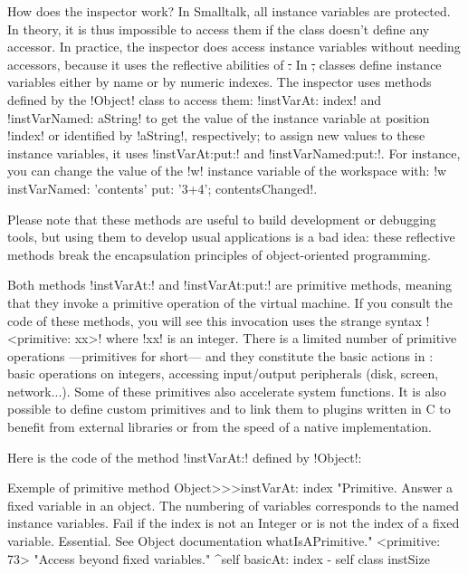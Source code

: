 \documentclass[a4paper,10pt,twoside]{book}
\begin{document}
How does the inspector work?
In Smalltalk, all instance variables are protected.
In theory, it is thus impossible to access them if the class doesn't define any accessor.
In practice, the inspector does access instance variables without needing accessors, because it uses the reflective abilities of \st.
In \st, classes define instance variables either by name or by numeric indexes.
The inspector uses methods defined by the \ct!Object! class to access them: \ct!instVarAt: index! and \ct!instVarNamed: aString! to get the value of the instance variable at position \ct!index! or identified by \ct!aString!, respectively; to assign new values to these instance variables, it uses \ct!instVarAt:put:! and \ct!instVarNamed:put:!.
For instance, you can change the value of the \ct!w! instance variable of the workspace with: \ct!w instVarNamed: 'contents' put: '3+4'; contentsChanged!.

Please note that these methods are useful to build development or debugging tools, but using them to develop usual applications is a bad idea: these reflective methods break the encapsulation principles of object-oriented programming.

Both methods \ct!instVarAt:! and \ct!instVarAt:put:! are primitive methods, meaning that they invoke a primitive operation of the \sq virtual machine.
If you consult the code of these methods, you will see this invocation uses the strange syntax \ct!<primitive: xx>! where \ct!xx! is an integer.
There is a limited number of primitive operations ---primitives for short--- and they constitute the basic actions in \sq: basic operations on integers, accessing input/output peripherals (disk, screen, network...).
Some of these primitives also accelerate system functions.
It is also possible to define custom primitives and to link them to plugins written in C to benefit from external libraries or from the speed of a native implementation.

Here is the code of the method \ct!instVarAt:! defined by \ct!Object!:
\begin{method}[instVarAt]{Exemple of primitive method}
Object>>>instVarAt: index
  "Primitive. Answer a fixed variable in an object. The numbering of variables corresponds to the named instance variables. Fail if the index is not an Integer or is not the index of a fixed variable. Essential. See Object documentation whatIsAPrimitive."
  <primitive: 73>
  "Access beyond fixed variables."
  ^self basicAt: index - self class instSize
\end{method}
\end{document}
